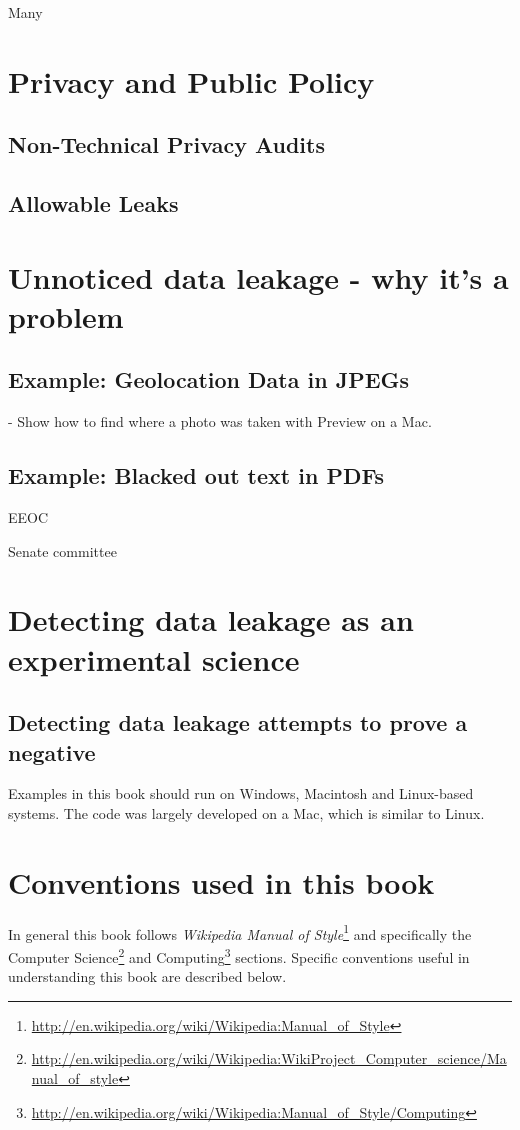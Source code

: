 Many 

\section{Privacy and Public Policy }

\subsection{Non-Technical Privacy Audits}

\subsection{Allowable Leaks}

\section{Unnoticed data leakage - why it's a problem}
\subsection{Example: Geolocation Data in JPEGs}
  - Show how to find where a photo was taken with Preview on a Mac. 
\subsection{Example: Blacked out text in PDFs}
EEOC

Senate committee

\section{Detecting data leakage as an experimental science}
\subsection{Detecting data leakage attempts to prove a negative}


Examples in this book should run on Windows, Macintosh and Linux-based
systems. The code was largely developed on a Mac, which is similar to
Linux. 

\section{Conventions used in this book}
In general this book follows \emph{Wikipedia Manual of
  Style}\footnote{\url{http://en.wikipedia.org/wiki/Wikipedia:Manual_of_Style}}
and specifically the Computer
Science\footnote{\url{http://en.wikipedia.org/wiki/Wikipedia:WikiProject_Computer_science/Manual_of_style}}
  and
  Computing\footnote{\url{http://en.wikipedia.org/wiki/Wikipedia:Manual_of_Style/Computing}}
  sections. Specific conventions useful in understanding this book are
  described below.

